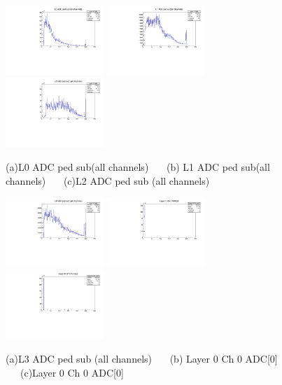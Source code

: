 \documentclass[a4paper,11pt]{article}
\theoremstyle{mytheor}
\begin{document}
\begin{figure}[H] 
\vspace*{-0.3cm} 
\includegraphics[width=0.33\textwidth,scale=0.5,trim=0 0 0 0,clip]{plotsdir/file0_test-adcL0ChAll-1.pdf} 
\includegraphics[width=0.33\textwidth,scale=0.5,trim=0 0 0 0,clip]{plotsdir/file0_test-adcL1ChAll-1.pdf} 
\includegraphics[width=0.33\textwidth,scale=0.5,trim=0 0 0 0,clip]{plotsdir/file0_test-adcL2ChAll-1.pdf} 
\caption{(a)L0 ADC ped sub(all channels) ~~~(b) L1 ADC ped sub(all channels) ~~~(c)L2 ADC ped sub (all channels) } 
\end{figure} 
\begin{figure}[H] 
\vspace*{-0.3cm} 
\includegraphics[width=0.33\textwidth,scale=0.5,trim=0 0 0 0,clip]{plotsdir/file0_test-adcL3ChAll-1.pdf} 
\includegraphics[width=0.33\textwidth,scale=0.5,trim=0 0 0 0,clip]{plotsdir/file0_test-Layer0_Ch0_adc0-1.pdf} 
\includegraphics[width=0.33\textwidth,scale=0.5,trim=0 0 0 0,clip]{plotsdir/file0_test-Layer0_Ch0_adc0-1.pdf} 
\caption{(a)L3 ADC ped sub (all channels) ~~~(b) Layer 0 Ch 0 ADC[0] ~~~(c)Layer 0 Ch 0 ADC[0] } 
\end{figure} 
\end{document}
